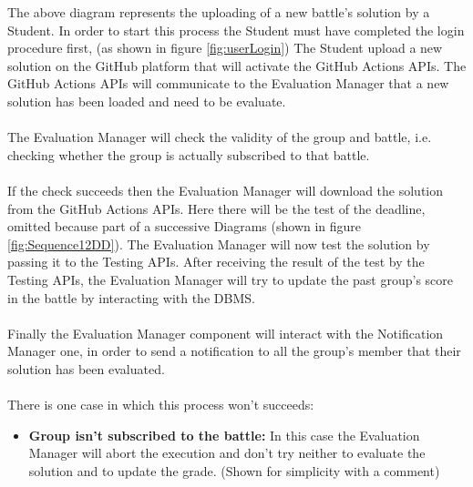 \documentclass{article}
\begin{document}
{        The above diagram represents the uploading of a new battle's solution by a Student.
        In order to start this process the Student must have 
        completed the login procedure first, (as shown in figure \ref{fig:userLogin})
        The Student upload a new solution on the GitHub platform that will activate the GitHub
        Actions APIs. The GitHub Actions APIs will communicate to the Evaluation Manager
        that a new solution has been loaded and need to be evaluate.
        \\ \\
        The Evaluation Manager will check the validity of the group and battle,
        i.e. checking whether the group is actually subscribed to that battle.
        \\ \\
        If the check succeeds then the Evaluation Manager will download the
        solution from the GitHub Actions APIs.
        Here there will be the test of the deadline, omitted because part
        of a successive Diagrams (shown in figure \ref{fig:Sequence12DD}).
        The Evaluation Manager will now test the solution by passing it to the Testing APIs.
        After receiving the result of the test by the Testing APIs, the Evaluation Manager will
        try to update the past group's score in the battle by interacting with the DBMS.
        \\ \\
        Finally the Evaluation Manager component will interact with the
        Notification Manager one, in order to send a notification to all the
        group's member that their solution has been evaluated.
        \\ \\
        There is one case in which this process won’t succeeds:        
        \begin{itemize}
            \item \textbf{Group isn't subscribed to the battle:} In this case the Evaluation Manager 
            will abort the execution and don't try neither to evaluate the solution and 
            to update the grade. (Shown for simplicity with a comment)
          \end{itemize}

}
\end{document}
